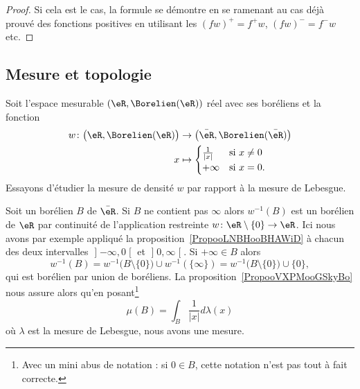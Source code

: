\begin{proof}
	Si cela est le cas, la formule se démontre en se ramenant au cas déjà prouvé des fonctions positives en utilisant les \( (fw)^+=f^+w\), \( (fw)^-=f^-w\) etc.
\end{proof}

\subsection{Mesure et topologie}

\begin{example}      \label{EXooKQDRooVMWaEC}
	Soit l'espace mesurable \( (\eR,\Borelien(\eR))\) réel avec ses boréliens et la fonction
	\begin{equation}
		\begin{aligned}
			w\colon \big( \eR,\Borelien(\eR) \big) & \to\big( \bar \eR,\Borelien(\bar \eR) \big) \\
			x                                      & \mapsto \begin{cases}
				\frac{1}{ | x | } & \text{si } x\neq 0 \\
				+\infty           & \text{si }x=0.
			\end{cases}
		\end{aligned}
	\end{equation}
	Essayons d'étudier la mesure de densité \( w\) par rapport à la mesure de Lebesgue.
	\begin{subproof}
		Soit un borélien \( B\) de \( \bar \eR\). Si \( B\) ne contient pas \( \infty\) alors \( w^{-1}(B)\) est un borélien de \( \eR\) par continuité de l'application restreinte \( w\colon \eR\setminus\{ 0 \}\to \eR \). Ici nous avons par exemple appliqué la proposition~\ref{PropooLNBHooBHAWiD} à chacun des deux intervalles \( \mathopen] -\infty , 0 \mathclose[\) et \( \mathopen] 0 , \infty \mathclose[\). Si \( +\infty\in B\) alors
		\begin{equation}
			w^{-1}(B)=w^{-1}\big( B\setminus\{ 0 \} \big)\cup w^{-1}(\{ \infty \})=  w^{-1}\big( B\setminus\{ 0 \} \big)\cup \{ 0 \},
		\end{equation}
		qui est borélien par union de boréliens.
		La proposition~\ref{PropooVXPMooGSkyBo} nous assure alors qu'en posant\footnote{Avec un mini abus de notation : si \( 0\in B\), cette notation n'est pas tout à fait correcte.}
		\begin{equation}
			\mu(B)=\int_B\frac{1}{ | x | }d\lambda(x)
		\end{equation}
		où \(  \lambda \) est la mesure de Lebesgue, nous avons une mesure.


\end{subproof}
\end{example}
